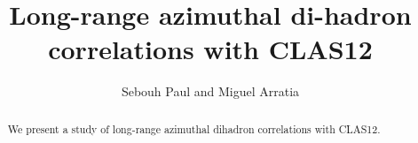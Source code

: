 \documentclass[H1,manyauthors]{ALICE_analysis_notes}
\begin{document}
%
%
%
\begin{titlepage}
%
\PHdate{\today}
%
\title{Long-range azimuthal di-hadron correlations with CLAS12}
%


\author{Sebouh Paul and Miguel Arratia}



%
\begin{abstract}
We present a study of long-range azimuthal dihadron correlations with CLAS12. 
\end{abstract}
\end{titlepage}
\tableofcontents











\FloatBarrier
 \begin{appendices}
 \appendix
 \end{appendices}
\FloatBarrier


\renewcommand\refname{Bibliography}
\end{document}
